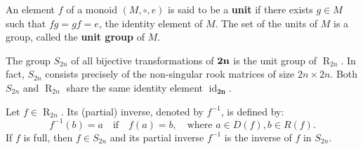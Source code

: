 \documentclass[11pt]{article}
\newcommand{\mb}{\mathbf}
\DeclareMathOperator{\id}{id}
\DeclareMathOperator{\R}{R}
\begin{document}
An element $f$ of a monoid $(M,\circ, e)$ is said to be a {\bf unit} if there exists $g\in M$ such that $fg=gf=e$, the identity element of $M$. The set of the units of $M$ is a group, called the \textbf{unit group} of $M.$ 

The group $S_{2n}$ of all bijective transformations of $\bf {2n}$ is the unit group of $\R_{2n}$. In fact, $S_{2n}$ consists precisely of the non-singular rook matrices of size ${2n}\times {2n}.$
Both $S_{2n}$ and $\R_{2n}$ share the same identity element $\id_{\mb{2n}}$.



Let $f\in\R_{2n}$. Its (partial) inverse, denoted by $f^{-1}$, is defined by:
\[
    f^{-1}(b) = a \quad\text{if}\quad f(a)=b, \quad\text{where } a\in D(f), b\in R(f).
\]
If $f$ is full, then $f\in S_{2n}$ and its partial inverse $f^{-1}$ is the inverse of $f$ in $S_{2n}$. 
\end{document}

